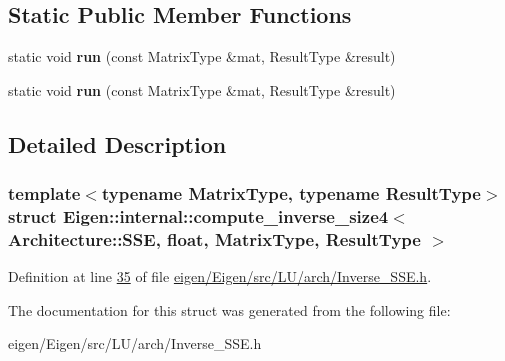 \subsection*{Static Public Member Functions}
\begin{DoxyCompactItemize}
\item 
\mbox{\label{struct_eigen_1_1internal_1_1compute__inverse__size4_3_01_architecture_1_1_s_s_e_00_01float_00_011c9f0f9df97321dfc4664a6d9e4a8f31_affc709e9578304b42627aa8e238455a9}} 
static void {\bfseries run} (const Matrix\+Type \&mat, Result\+Type \&result)
\item 
\mbox{\label{struct_eigen_1_1internal_1_1compute__inverse__size4_3_01_architecture_1_1_s_s_e_00_01float_00_011c9f0f9df97321dfc4664a6d9e4a8f31_affc709e9578304b42627aa8e238455a9}} 
static void {\bfseries run} (const Matrix\+Type \&mat, Result\+Type \&result)
\end{DoxyCompactItemize}


\subsection{Detailed Description}
\subsubsection*{template$<$typename Matrix\+Type, typename Result\+Type$>$\newline
struct Eigen\+::internal\+::compute\+\_\+inverse\+\_\+size4$<$ Architecture\+::\+S\+S\+E, float, Matrix\+Type, Result\+Type $>$}



Definition at line \hyperlink{eigen_2_eigen_2src_2_l_u_2arch_2_inverse___s_s_e_8h_source_l00035}{35} of file \hyperlink{eigen_2_eigen_2src_2_l_u_2arch_2_inverse___s_s_e_8h_source}{eigen/\+Eigen/src/\+L\+U/arch/\+Inverse\+\_\+\+S\+S\+E.\+h}.



The documentation for this struct was generated from the following file\+:\begin{DoxyCompactItemize}
\item 
eigen/\+Eigen/src/\+L\+U/arch/\+Inverse\+\_\+\+S\+S\+E.\+h\end{DoxyCompactItemize}
